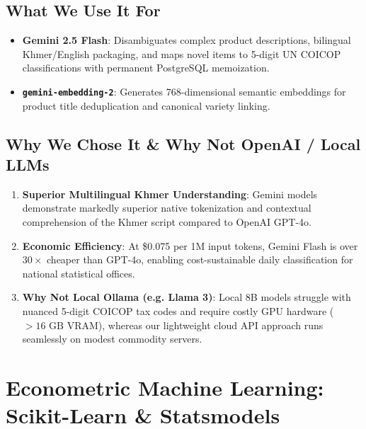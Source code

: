 \documentclass[a4paper, 11pt]{article}
\begin{document}
\subsection{What We Use It For}
\begin{itemize}[leftmargin=*]
    \item \textbf{Gemini 2.5 Flash}: Disambiguates complex product descriptions, bilingual Khmer/English packaging, and maps novel items to 5-digit UN COICOP classifications with permanent PostgreSQL memoization.
    \item \textbf{\texttt{gemini-embedding-2}}: Generates 768-dimensional semantic embeddings for product title deduplication and canonical variety linking.
\end{itemize}

\subsection{Why We Chose It \& Why Not OpenAI / Local LLMs}
\begin{enumerate}[leftmargin=*]
    \item \textbf{Superior Multilingual Khmer Understanding}: Gemini models demonstrate markedly superior native tokenization and contextual comprehension of the Khmer script compared to OpenAI GPT-4o.
    \item \textbf{Economic Efficiency}: At \$0.075 per 1M input tokens, Gemini Flash is over $30\times$ cheaper than GPT-4o, enabling cost-sustainable daily classification for national statistical offices.
    \item \textbf{Why Not Local Ollama (e.g. Llama 3)}: Local 8B models struggle with nuanced 5-digit COICOP tax codes and require costly GPU hardware ($>16\text{ GB VRAM}$), whereas our lightweight cloud API approach runs seamlessly on modest commodity servers.
\end{enumerate}

\section{Econometric Machine Learning: Scikit-Learn \& Statsmodels}
\end{document}
